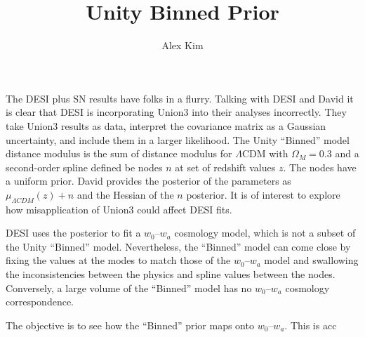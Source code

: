 \documentclass[11pt, oneside]{article}   	%
\title{Unity Binned Prior}
\author{Alex Kim}
\begin{document}
\maketitle

The DESI plus SN results have folks in a flurry.  Talking with DESI and David it is clear that DESI is incorporating Union3
into their analyses incorrectly.  They take Union3 results as data, interpret the covariance matrix as a Gaussian uncertainty,
and include them in a larger likelihood.  The Unity ``Binned'' model distance modulus
is the sum of distance modulus for $\Lambda$CDM with $\Omega_M=0.3$ and a second-order spline defined be nodes $n$ at set of redshift values $z$.  The nodes have a uniform prior.  David provides the posterior of the parameters as
$\mu_{\Lambda CDM}(z) + n$ and the  Hessian of the $n$ posterior.  It is of interest to explore how misapplication
of Union3 could affect DESI fits.

DESI uses the posterior to fit a $w_0$--$w_a$ cosmology model, which is not a subset of the Unity ``Binned'' model.  Nevertheless,
the ``Binned'' model can come close by fixing the values at the modes to match those of the $w_0$--$w_a$  model and swallowing the
inconsistencies between the physics and spline values between the nodes.  Conversely, a large volume of the ``Binned'' model
has no $w_0$--$w_a$ cosmology correspondence.

The objective is to see how the ``Binned'' prior maps onto $w_0$--$w_a$.  This is acc
\end{document}
